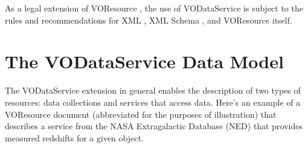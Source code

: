 \documentclass[11pt,a4paper]{ivoa}
\begin{document}
As a legal extension of VOResource \citep{VOR}, the use
of VODataService is subject to the rules and recommendations for XML
\citep{xml}, XML Schema \citep{schema},
and VOResource itself.  


\section{The VODataService Data Model}


The VODataService extension in general enables the description of two
types of resources:  data collections and services that access data.
Here's an example of a VOResource document (abbreviated for the
purposes of illustration) that describes a service from the NASA
Extragalactic Database (NED) that provides measured redshifts for a
given object.
\end{document}
